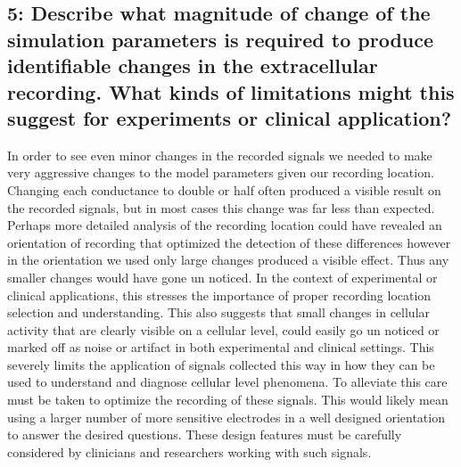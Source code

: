 \documentclass[12pt]{article}
\begin{document}
\subsection{5: Describe what magnitude of change of the simulation parameters is required to produce identifiable changes in the extracellular recording. What kinds of limitations might this suggest for experiments or clinical application?}
\par{}
In order to see even minor changes in the recorded signals we needed to make very aggressive changes to the model parameters given our recording location. Changing each conductance to double or half often produced a visible result on the recorded signals, but in most cases this change was far less than expected. Perhaps more detailed analysis of the recording location could have revealed an orientation of recording that optimized the detection of these differences however in the orientation we used only large changes produced a visible effect. Thus any smaller changes would have gone un noticed. In the context of experimental or clinical applications, this stresses the importance of proper recording location selection and understanding. This also suggests that small changes in cellular activity that are clearly visible on a cellular level, could easily go un noticed or marked off as noise or artifact in both experimental and clinical settings. This severely limits the application of signals collected this way in how they can be used to understand and diagnose cellular level phenomena. To alleviate this care must be taken to optimize the recording of these signals. This would likely mean using a larger number of more sensitive electrodes in a well designed orientation to answer the desired questions. These design features must be carefully considered by clinicians and researchers working with such signals.
\end{document}
